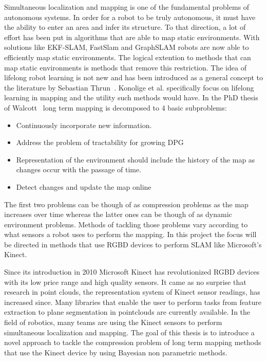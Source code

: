 \documentclass[twoside,hidelinks]{article}
\begin{document}
Simultaneous localization and mapping is one of the fundamental problems of autonomous systems\cite{probRobs}. In order for a robot to be truly autonomous, it must have the ability to enter an area and infer its structure. To that direction, a lot of effort has been put in algorithms that are able to map static environments. With solutions like EKF-SLAM\cite{ekf}, FastSlam\cite{slam} and GraphSLAM\cite{graph} robots are now able to efficiently map static environments. 
The logical extention to methods that can map  static environments is methods that remove this restriction. The idea of lifelong robot learning is not new and has been introduced as a general concept to the literature by Sebastian Thrun~\cite{liflonglearning}. Konolige et al.\cite{lifelongmaps} specifically focus on lifelong learning in mapping and the utility such methods would have.  In the PhD thesis of Walcott~\cite{aishalong} long term mapping is decomposed to 4 basic subproblems:
\begin{itemize}
	\item{Continuously incorporate new information.}
	\item{Address the problem of tractability for growing DPG}
	\item{Representation of the environment should include the history of the map as changes occur	with the passage of time.}
	\item{Detect changes and update the map online}
\end{itemize}

The first two problems can be though of as compression problems as the map increases over time whereas the latter ones can be though of as dynamic environment problems. Methods of tackling those problems vary according to what sensors a robot uses to perform the mapping. In this project the focus will be directed in methods that use RGBD devices to perform SLAM like Microsoft's Kinect.

Since its introduction in 2010 Microsoft Kinect\cite{kinect} has revolutionized RGBD devices with its low price range and high quality sensors. It came as no surprise that research in point clouds, the representation system of Kinect sensor readings, has increased since. Many libraries that enable the user to perform tasks from feature extraction to plane segmentation\cite{pcl} in pointclouds are currently available. In the field of robotics, many teams are using the Kinect sensors to perform simultaneous localization and mapping\cite{rtabmap}. The goal of this thesis is to introduce a novel approach to tackle the compression problem of long term mapping methods that use the Kinect device by using Bayesian non parametric methods.
\end{document}
